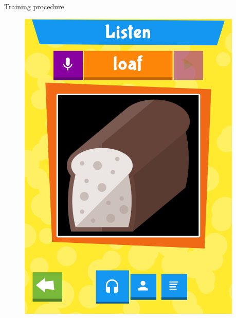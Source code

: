 \documentclass[final,xcolor={cmyk,hyperref}]{beamer}
\begin{document}
\begin{frame}[t]
\begin{columns}[t]
\begin{column}{0.45\linewidth}
\begin{block}{Training procedure}
\begin{figure}[h]
\begin{columns}
\begin{column}{\screenshotwidth}
    \includegraphics[width=\linewidth]{images/CALVin-screenshots/jpgs/word}
  \end{column}
  \begin{column}{\screenshotwidth}

\end{column}
\end{columns}
\end{figure}
\end{block}
\end{column}
\end{columns}
\end{frame}
\end{document}
